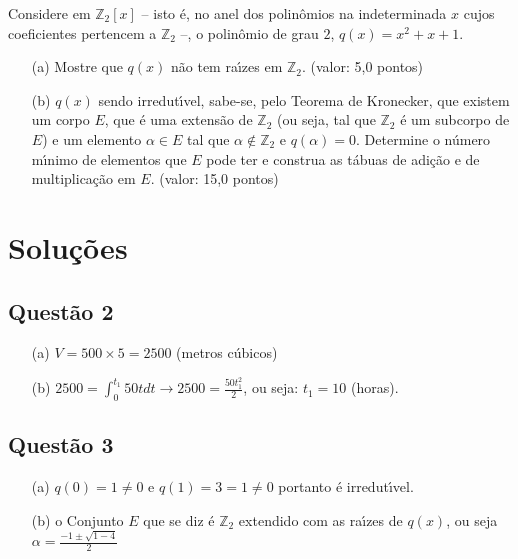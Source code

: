 Considere em $\mathbb Z_2[x]$ – isto \'e, no anel dos polinômios na indeterminada $x$ cujos coeficientes pertencem a $\mathbb Z_2$ –, o polinômio de grau $2$, $q (x) = x^2 + x + 1$.

\begin{enumerate}

\item[(a)] Mostre que $q(x)$ n\~ao tem ra\'\i zes em $\mathbb Z_2$. (valor: 5,0 pontos)

\item[(b)] $q(x)$ sendo irredut\'\i vel, sabe-se, pelo Teorema de Kronecker, que existem um corpo $E$, que \'e uma extens\~ao de $\mathbb Z_2$ (ou seja, tal que $\mathbb Z_2$ \'e um subcorpo de $E$) e um elemento $\alpha \in E$ tal que $\alpha \notin \mathbb Z_2$ e $q(\alpha) = 0$. Determine o n\'umero m\'\i nimo de elementos que $E$ pode ter e construa as t\'abuas de adi\c c\~ao e de multiplica\c c\~ao em $E$. (valor: 15,0 pontos)

\end{enumerate}

\section{\color{red} Solu\c c\~oes}


\subsection{\color{red} Quest\~ao 2}

\begin{enumerate}

\item[(a)] $V=500\times 5=2500$ (metros c\'ubicos)

\item[(b)] $2500=\displaystyle \int_0^{t_1} 50 t dt \longrightarrow 2500=\frac{50t_1^2}{2}$, ou seja: $t_1=10$ (horas).

\end{enumerate}

\subsection{\color{red} Quest\~ao 3}

\begin{enumerate}

\item[(a)] $q(0)=1\neq 0$ e $q(1)=3=1\neq 0$ portanto \'e irredut\'\i vel.

\item[(b)] o Conjunto $E$ que se diz \'e $\mathbb Z_2$ extendido com as ra\'\i zes de $q(x)$, ou seja $\alpha=\displaystyle\frac{-1\pm \sqrt{1-4}}{2}$

\end{enumerate}

